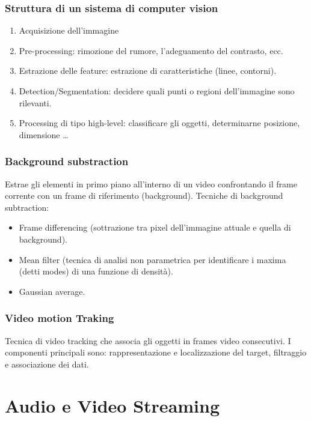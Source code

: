 \documentclass[8pt,a4paper]{article}
\begin{document}
\begin{multicols}{5}
    \subsubsection{Struttura di un sistema di computer vision}
    \begin{enumerate}
      \item Acquisizione dell’immagine
      \item Pre-processing: rimozione del rumore, l’adeguamento del contrasto, ecc.
      \item Estrazione delle feature: estrazione di caratteristiche (linee, contorni).
      \item Detection/Segmentation: decidere quali punti o regioni dell’immagine sono 
      rilevanti.
      \item Processing di tipo high-level: classificare gli oggetti, determinarne 
      posizione, dimensione …
    \end{enumerate}
    
    \subsubsection{Background substraction}
    Estrae gli elementi in primo piano all’interno di un video confrontando il frame 
    corrente con un frame di riferimento (background). Tecniche di background subtraction: 
    \begin{itemize}
      \item Frame differencing (sottrazione tra pixel dell’immagine attuale e quella di 
      background).
      \item Mean filter (tecnica di analisi non parametrica per identificare i maxima 
      (detti modes) di una funzione di densità).
      \item Gaussian average.
    \end{itemize}

    \subsubsection{Video motion Traking}
    Tecnica di video tracking che associa gli oggetti in frames video consecutivi. I 
    componenti principali sono: rappresentazione e localizzazione del target, 
    filtraggio e associazione dei dati.
    \section{Audio e Video Streaming}

\end{multicols}
\end{document}
